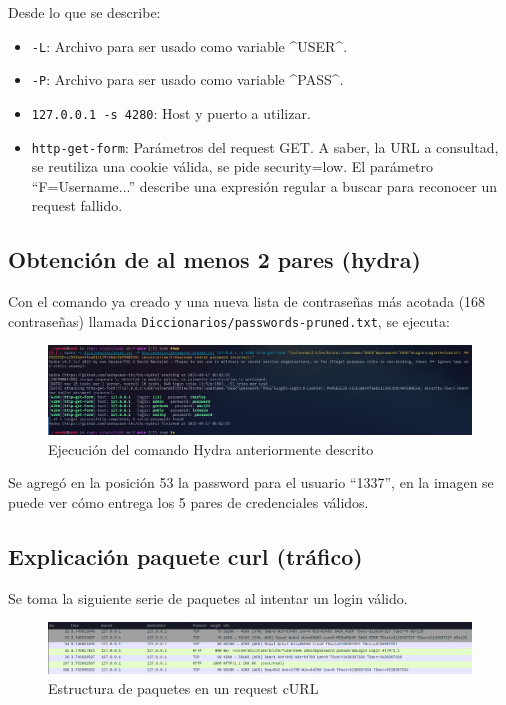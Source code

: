 \documentclass[letter,12pt]{article}
\newcommand{\code}[1]{\colorbox{lightgray!80}{\lstinline[breaklines=true]|#1|}}
\begin{document}
Desde lo que se describe:

\begin{itemize}
        \item \code{-L}: Archivo para ser usado como variable \^{}USER\^{}.
        \item \code{-P}: Archivo para ser usado como variable \^{}PASS\^{}.
        \item \code{127.0.0.1 -s 4280}: Host y puerto a utilizar.
        \item \code{http-get-form}: Parámetros del request GET. A saber, la URL
        a consultad, se reutiliza una cookie válida, se pide security=low. El
        parámetro ``F=Username...'' describe una expresión regular a buscar para
        reconocer un request fallido.
\end{itemize}

\subsection{Obtención de al menos 2 pares (hydra)}
Con el comando ya creado y una nueva lista de contraseñas más acotada (168
contraseñas) llamada \code{Diccionarios/passwords-pruned.txt}, se ejecuta:

\begin{figure}[H]
  \centering
  \includegraphics[width=16.5cm]{images/22-hydra-command.png}
  \caption{Ejecución del comando Hydra anteriormente descrito}
\end{figure}

Se agregó en la posición 53 la password para el usuario ``1337'', en la imagen
se puede ver cómo entrega los 5 pares de credenciales válidos.
\subsection{Explicación paquete curl (tráfico)}
Se toma la siguiente serie de paquetes al intentar un login válido.

\begin{figure}[H]
  \centering
  \includegraphics[width=16.5cm]{images/18-curl-packets.png}
  \caption{Estructura de paquetes en un request cURL}
\end{figure}
\end{document}
